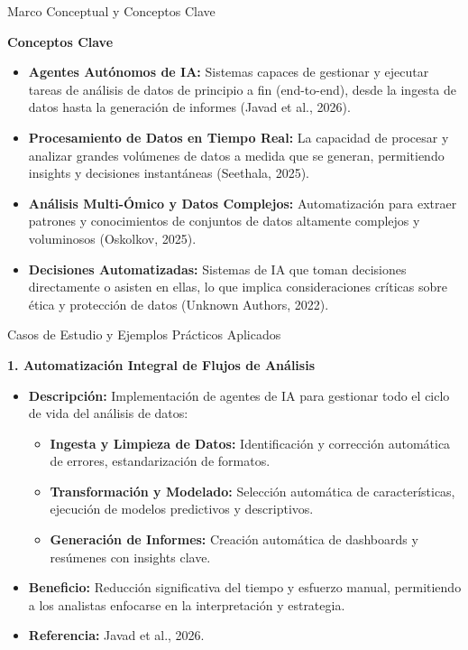 \documentclass[aspectratio=169]{beamer}
\begin{document}
\begin{frame}{Marco Conceptual y Conceptos Clave}

\textbf{Conceptos Clave}
\begin{itemize}
  \item \textbf{Agentes Autónomos de IA:} Sistemas capaces de gestionar y ejecutar tareas de análisis de datos de principio a fin (end-to-end), desde la ingesta de datos hasta la generación de informes (Javad et al., 2026).
  \item \textbf{Procesamiento de Datos en Tiempo Real:} La capacidad de procesar y analizar grandes volúmenes de datos a medida que se generan, permitiendo insights y decisiones instantáneas (Seethala, 2025).
  \item \textbf{Análisis Multi-Ómico y Datos Complejos:} Automatización para extraer patrones y conocimientos de conjuntos de datos altamente complejos y voluminosos (Oskolkov, 2025).
  \item \textbf{Decisiones Automatizadas:} Sistemas de IA que toman decisiones directamente o asisten en ellas, lo que implica consideraciones críticas sobre ética y protección de datos (Unknown Authors, 2022).
\end{itemize}
\end{frame}

\begin{frame}{Casos de Estudio y Ejemplos Prácticos Aplicados}

\textbf{1. Automatización Integral de Flujos de Análisis}
\begin{itemize}
  \item \textbf{Descripción:} Implementación de agentes de IA para gestionar todo el ciclo de vida del análisis de datos:
  \begin{itemize}
    \item \textbf{Ingesta y Limpieza de Datos:} Identificación y corrección automática de errores, estandarización de formatos.
    \item \textbf{Transformación y Modelado:} Selección automática de características, ejecución de modelos predictivos y descriptivos.
    \item \textbf{Generación de Informes:} Creación automática de dashboards y resúmenes con insights clave.
  \end{itemize}
  \item \textbf{Beneficio:} Reducción significativa del tiempo y esfuerzo manual, permitiendo a los analistas enfocarse en la interpretación y estrategia.
  \item \textbf{Referencia:} Javad et al., 2026.
\end{itemize}
\end{frame}
\end{document}
